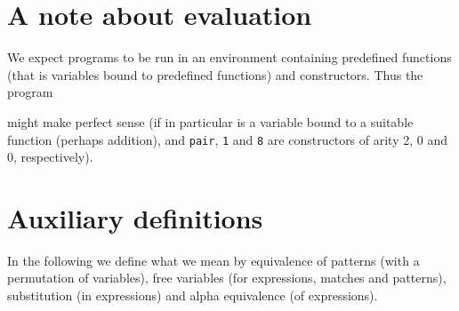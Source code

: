 \section{A note about evaluation}
We expect programs to be run in an environment containing predefined functions
(that is variables bound to predefined functions) and constructors. Thus the
program
\begin{quote}
\end{quote}
might make perfect sense (if in particular  is a variable bound to a
suitable function (perhaps addition), and \texttt{pair}, \texttt{1} and
\texttt{8} are constructors of arity 2, 0 and 0, respectively).
\section{Auxiliary definitions}
\label{sec:auxil-defin}

In the following we define what we mean by equivalence of patterns (with a
permutation of variables), free variables (for expressions, matches and
patterns), substitution (in expressions) and alpha equivalence (of expressions).


